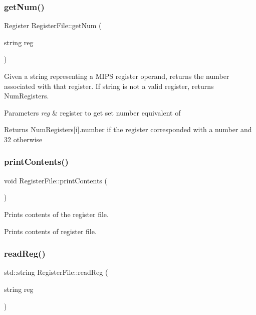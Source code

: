 \subsubsection{\texorpdfstring{get\+Num()}{getNum()}}
{\footnotesize\ttfamily Register Register\+File\+::get\+Num (\begin{DoxyParamCaption}\item[{string}]{reg }\end{DoxyParamCaption})}

Given a string representing a M\+I\+PS register operand, returns the number associated with that register. If string is not a valid register, returns Num\+Registers. 
\begin{DoxyParams}{Parameters}
{\em reg} & register to get set number equivalent of \\
\hline
\end{DoxyParams}
\begin{DoxyReturn}{Returns}
Num\+Registers\mbox{[}i\mbox{]}.number if the register corresponded with a number and 32 otherwise 
\end{DoxyReturn}
\mbox{\label{class_register_file_ac72ef70e7bdee7b5ac7afbfdcd6d8ab1}} 
\subsubsection{\texorpdfstring{print\+Contents()}{printContents()}}
{\footnotesize\ttfamily void Register\+File\+::print\+Contents (\begin{DoxyParamCaption}{ }\end{DoxyParamCaption})}



Prints contents of the register file. 

Prints contents of register file. \mbox{\label{class_register_file_a5554dd7d1b78c4a59b23036e9aa66136}} 
\subsubsection{\texorpdfstring{read\+Reg()}{readReg()}}
{\footnotesize\ttfamily std\+::string Register\+File\+::read\+Reg (\begin{DoxyParamCaption}\item[{string}]{reg }\end{DoxyParamCaption})}

